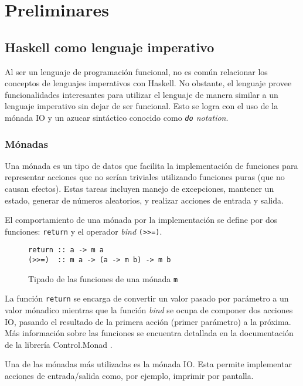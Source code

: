 \chapter{Preliminares}\label{chap:prelims}

\section{Haskell como lenguaje imperativo}

Al ser un lenguaje de programación funcional, no es común relacionar los conceptos de lenguajes imperativos con Haskell. No obstante, el lenguaje provee funcionalidades interesantes para utilizar el lenguaje de manera similar a un lenguaje imperativo sin dejar de ser funcional.
Esto se logra con el uso de la mónada IO y un azucar sintáctico conocido como \emph{\texttt{do} notation}.

\subsection{Mónadas}
Una mónada es un tipo de datos que facilita la implementación de funciones para representar acciones que no serían triviales utilizando funciones puras (que no causan efectos). Estas tareas incluyen manejo de excepciones, mantener un estado, generar de números aleatorios, y realizar acciones de entrada y salida.

El comportamiento de una mónada por la implementación se define por dos funciones: \texttt{return} y el operador \emph{bind} \texttt{(>>=)}.

\begin{figure}[H]
  \centering
\begin{verbatim}
return :: a -> m a
(>>=)  :: m a -> (a -> m b) -> m b
\end{verbatim}
  \caption{Tipado de las funciones de una mónada \texttt{m}}
  \label{fig:io-functions}
\end{figure}

La función \texttt{return} se encarga de convertir un valor pasado por parámetro a un valor mónadico mientras que la función \emph{bind} se ocupa de componer dos acciones IO, pasando el resultado de la primera acción (primer parámetro) a la próxima. Más información sobre las funciones se encuentra detallada en la documentación de la librería Control.Monad \cite{control-monad}.

Una de las mónadas más utilizadas es la mónada IO. Esta permite implementar acciones de entrada/salida como, por ejemplo, imprimir por pantalla.

